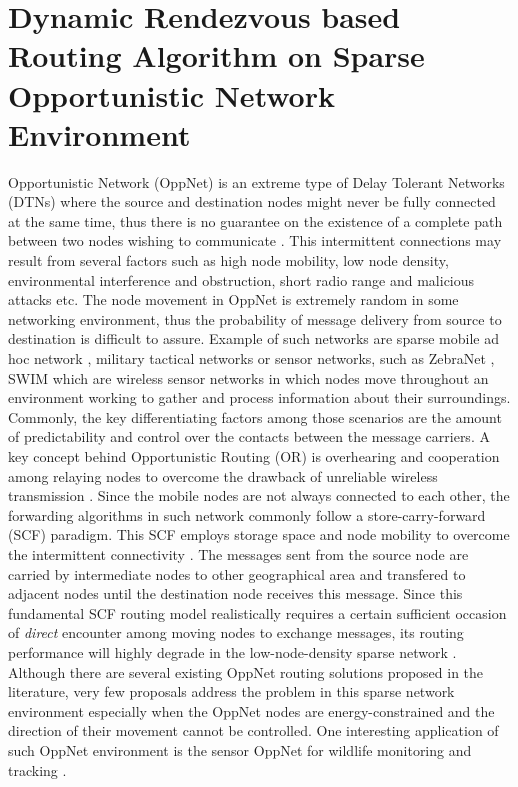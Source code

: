 \chapter{Dynamic Rendezvous based Routing Algorithm on Sparse Opportunistic Network Environment}
\label{DRRA}


Opportunistic Network (OppNet) is an extreme type of Delay Tolerant Networks (DTNs) where the source and destination nodes might never be fully connected at the same time, thus there is no guarantee on the existence of a complete path between two nodes wishing to communicate \cite{MWNsBook2011}.
This intermittent connections may result from several factors such as high node mobility, low node density, environmental interference and obstruction, short radio range and malicious attacks \cite{prodhan2011} etc.
The node movement in OppNet is extremely random in some networking environment, thus the probability of message delivery from source to destination is difficult to assure.
Example of such networks are sparse mobile ad hoc network \cite{Alekeish2012}, military tactical networks \cite{Scott2005,Kerdsri2013}  or sensor networks, such as ZebraNet \cite{zebranet2004}, SWIM \cite{Small2003}  which are wireless sensor networks in which nodes move throughout an environment working to gather and process information about their surroundings.
Commonly, the key differentiating factors among those scenarios are the amount of predictability and control over the contacts between the message carriers\cite{Karkkainen2013}.
A key concept behind Opportunistic Routing (OR) is overhearing and cooperation among relaying nodes to overcome the drawback of unreliable wireless transmission \cite{Liu2009}.
Since the mobile nodes are not always connected to each other, the forwarding algorithms in such network commonly follow a store-carry-forward (SCF) paradigm.
This SCF employs storage space and node mobility to overcome the intermittent connectivity \cite{Ma2011}.
The messages sent from the source node are carried by intermediate nodes to other geographical area and transfered to adjacent nodes until the destination node receives this message.
Since this fundamental SCF routing model realistically requires a certain sufficient occasion of \emph{direct} encounter among moving nodes to exchange messages, its routing performance will highly degrade in the low-node-density sparse network \cite{Spyropoulos2010}.
Although there are several existing OppNet routing solutions \cite{ Zhang2013, Chung-Ming2008, Spyropoulos2004, Grossglauser2002, Vahdat2000,Kerdsri2013} proposed in the literature, very few proposals address the problem in this sparse network environment especially when the OppNet nodes are energy-constrained \cite{Liguang2013,Eu2010} and the direction of their movement cannot be controlled.
One interesting application of such OppNet environment is the sensor OppNet for wildlife monitoring and tracking \cite{zebranet2004, Small2003}.

